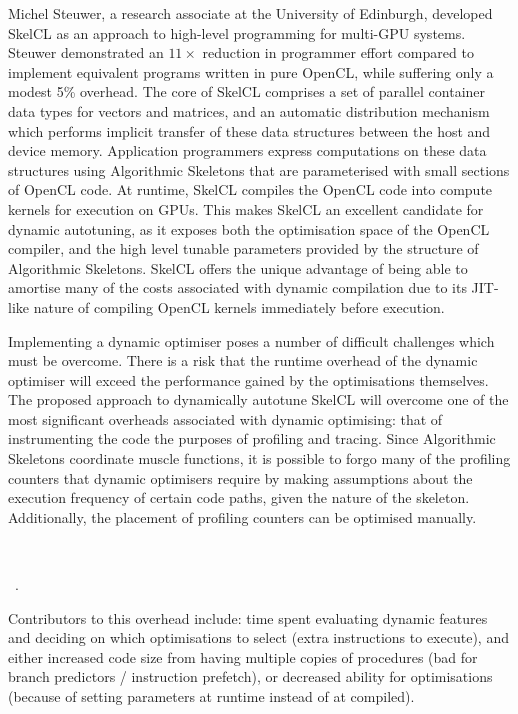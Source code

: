 Michel Steuwer, a research associate at the University of Edinburgh,
developed SkelCL as an approach to high-level programming for
multi-GPU systems. Steuwer demonstrated an $11\times$ reduction in
programmer effort compared to implement equivalent programs written in
pure OpenCL, while suffering only a modest 5\% overhead. The core of
SkelCL comprises a set of parallel container data types for vectors
and matrices, and an automatic distribution mechanism which performs
implicit transfer of these data structures between the host and device
memory. Application programmers express computations on these data
structures using Algorithmic Skeletons that are parameterised with
small sections of OpenCL code. At runtime, SkelCL compiles the OpenCL
code into compute kernels for execution on GPUs. This makes SkelCL an
excellent candidate for dynamic autotuning, as it exposes both the
optimisation space of the OpenCL compiler, and the high level tunable
parameters provided by the structure of Algorithmic Skeletons. SkelCL
offers the unique advantage of being able to amortise many of the
costs associated with dynamic compilation due to its JIT-like nature
of compiling OpenCL kernels immediately before execution.

Implementing a dynamic optimiser poses a number of difficult
challenges which must be overcome.
There is a risk that the runtime overhead of the dynamic optimiser
will exceed the performance gained by the optimisations
themselves. The proposed approach to dynamically autotune SkelCL will
overcome one of the most significant overheads associated with dynamic
optimising: that of instrumenting the code the purposes of profiling
and tracing. Since Algorithmic Skeletons coordinate muscle functions,
it is possible to forgo many of the profiling counters that dynamic
optimisers require by making assumptions about the execution frequency
of certain code paths, given the nature of the skeleton. Additionally,
the placement of profiling counters can be optimised manually.

~\cite{Steuwer2011, Steuwer2013a}

~\cite{Steuwer2012}.

Contributors to this overhead include: time spent evaluating dynamic
features and deciding on which optimisations to select (extra
instructions to execute), and either increased code size from having
multiple copies of procedures (bad for branch predictors / instruction
prefetch), or decreased ability for optimisations (because of setting
parameters at runtime instead of at compiled).

